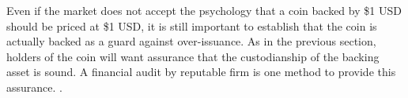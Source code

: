 
Even if the market does not accept the psychology that a coin backed by \$1 USD should be priced at \$1 USD, it is still important to establish that the coin is actually backed as a guard against over-issuance. As in the previous section, holders of the coin will want assurance that the custodianship of the backing asset is sound. A financial audit by reputable firm is one method to provide this assurance. .







